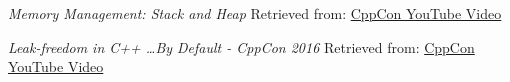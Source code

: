     \emph{Memory Management: Stack and Heap}
    \newline
    Retrieved from: \href{https://icarus.cs.weber.edu/~dab/cs1410/textbook/4.Pointers/memory.html}{CppCon YouTube Video}
    
    \emph{Leak-freedom in C++ \dots By Default - CppCon 2016}
    \newline
    Retrieved from: \href{https://www.youtube.com/watch?v=JfmTagWcqoE&ab_channel=CppCon}{CppCon YouTube Video}
    
    
